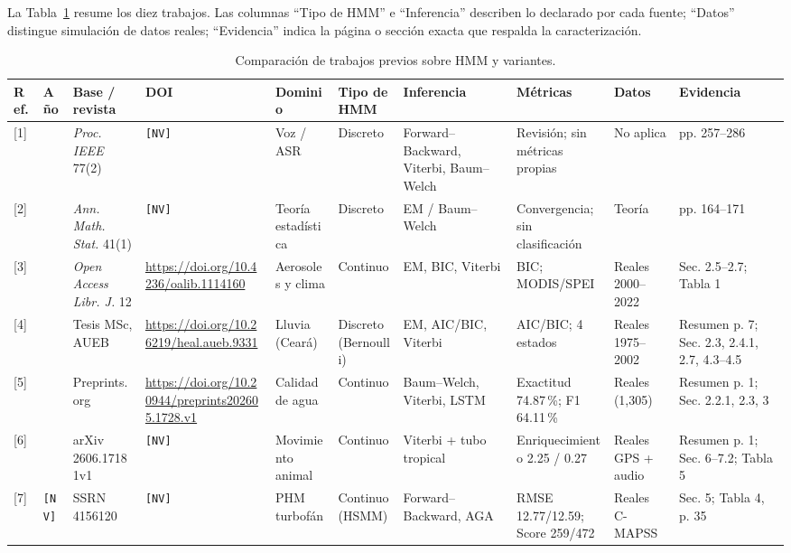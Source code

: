 \documentclass[11pt,a4paper]{article}
\begin{document}
La Tabla~\ref{tab:comparativa} resume los diez trabajos. Las columnas ``Tipo de HMM'' e ``Inferencia'' describen lo declarado por cada fuente; ``Datos'' distingue simulación de datos reales; ``Evidencia'' indica la página o sección exacta que respalda la caracterización.

\begin{table}
\centering
\caption{Comparación de trabajos previos sobre HMM y variantes.}
\label{tab:comparativa}
\footnotesize
\setlength{\tabcolsep}{3pt}
\begin{tabular}{@{}>{\raggedright\arraybackslash}p{0.6cm}>{\raggedright\arraybackslash}p{0.9cm}>{\raggedright\arraybackslash}p{2.6cm}>{\raggedright\arraybackslash}p{3.5cm}>{\raggedright\arraybackslash}p{2.3cm}>{\raggedright\arraybackslash}p{2.4cm}>{\raggedright\arraybackslash}p{3.1cm}>{\raggedright\arraybackslash}p{3.0cm}>{\raggedright\arraybackslash}p{2.3cm}>{\raggedright\arraybackslash}p{2.9cm}@{}}
\toprule
Ref. & Año & Base / revista & DOI & Dominio & Tipo de HMM & Inferencia & Métricas & Datos & Evidencia\\
\midrule
{}[1] & 1989 & \emph{Proc. IEEE} 77(2) & \texttt{[NV]} & Voz / ASR & Discreto & Forward--Backward, Viterbi, Baum--Welch & Revisión; sin métricas propias & No aplica & pp. 257--286\\
{}[2] & 1970 & \emph{Ann. Math. Stat.} 41(1) & \texttt{[NV]} & Teoría estadística & Discreto & EM / Baum--Welch & Convergencia; sin clasificación & Teoría & pp. 164--171\\
{}[3] & 2025 & \emph{Open Access Libr. J.} 12 & \url{https://doi.org/10.4236/oalib.1114160} & Aerosoles y clima & Continuo & EM, BIC, Viterbi & BIC; MODIS/SPEI & Reales 2000--2022 & Sec. 2.5--2.7; Tabla 1\\
{}[4] & 2025 & Tesis MSc, AUEB & \url{https://doi.org/10.26219/heal.aueb.9331} & Lluvia (Ceará) & Discreto (Bernoulli) & EM, AIC/BIC, Viterbi & AIC/BIC; 4 estados & Reales 1975--2002 & Resumen p. 7; Sec. 2.3, 2.4.1, 2.7, 4.3--4.5\\
{}[5] & 2026 & Preprints.org & \url{https://doi.org/10.20944/preprints202605.1728.v1} & Calidad de agua & Continuo & Baum--Welch, Viterbi, LSTM & Exactitud 74.87\,\%; F1 64.11\,\% & Reales (1{,}305) & Resumen p. 1; Sec. 2.2.1, 2.3, 3\\
{}[6] & 2026 & arXiv 2606.17181v1 & \texttt{[NV]} & Movimiento animal & Continuo & Viterbi + tubo tropical & Enriquecimiento 2.25 / 0.27 & Reales GPS + audio & Resumen p. 1; Sec. 6--7.2; Tabla 5\\
{}[7] & \texttt{[NV]} & SSRN 4156120 & \texttt{[NV]} & PHM turbofán & Continuo (HSMM) & Forward--Backward, AGA & RMSE 12.77/12.59; Score 259/472 & Reales C-MAPSS & Sec. 5; Tabla 4, p. 35\\

\end{tabular}
\end{table}
\end{document}
